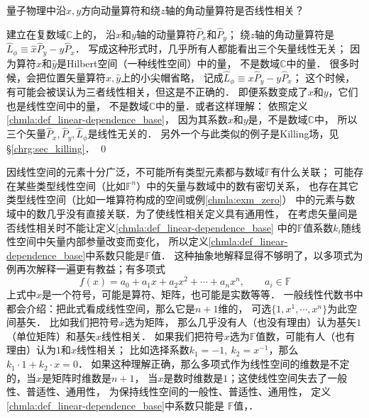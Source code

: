 \begin{example}
    量子物理中沿$x,y$方向动量算符和绕$z$轴的角动量算符是否线性相关？
\end{example}
建立在复数域$\mathbb{C}$上的，
沿$x$和$y$轴的动量算符$\hat{P}_x$和$\hat{P}_y$；
绕$z$轴的角动量算符是$\hat{L}_\phi \equiv \hat{x} \hat{P}_y-\hat{y}\hat{P}_x$．
写成这种形式时，几乎所有人都能看出三个矢量线性无关；
因为算符$\hat{x}$和$\hat{y}$是Hilbert空间（一种线性空间）中的量，
不是数域$\mathbb{C}$中的量．
很多时候，会把位置矢量算符$\hat{x},\hat{y}$上的小尖帽省略，
记成$\hat{L}_\phi \equiv {x} \hat{P}_y-{y}\hat{P}_x$；
这个时候，有可能会被误认为三者线性相关，但这是不正确的．
即便系数变成了$x$和$y$，它们也是线性空间中的量，
不是数域$\mathbb{C}$中的量．或者这样理解：
依照定义\ref{chmla:def_linear-dependence_base}，
因为其系数$x$和$y$是{}，不是数域$\mathbb{C}$中{}，
所以三个矢量$\hat{P}_x, \hat{P}_y, \hat{L}_\phi$是线性无关的．
另外一个与此类似的例子是Killing场，见\S \ref{chrg:sec_killing}．
\qed

因线性空间的元素十分广泛，不可能所有类型元素都与数域$\mathbb{F}$有什么关联；
可能存在某些类型线性空间（比如$\mathbb{F}^n$）中的矢量与数域中的数有密切关系，
也存在其它类型线性空间（比如一堆算符构成的空间或例\ref{chmla:exm_zero}）
中的元素与数域中的数几乎没有直接关联．为了使线性相关定义具有通用性，
在考虑矢量间是否线性相关时不能让定义\ref{chmla:def_linear-dependence_base}
中的$\mathbb{F}$值系数$k_i$随线性空间中矢量内部参量改变而变化，
所以定义\ref{chmla:def_linear-dependence_base}中系数只能是$\mathbb{F}$值．
这种抽象地解释显得不够明了，以多项式为例再次解释一遍更有教益；有多项式
\begin{equation}
    f(x)=a_0+a_1 x+ a_2 x^2 + \cdots+ a_n x^n, \qquad a_i \in \mathbb{F}
\end{equation}
上式中$x$是一个符号，可能是算符、矩阵，也可能是实数等等．
一般线性代数书中都会介绍：把此式看成线性空间，那么它是$n+1$维的，
可选$\{1,x^1,\cdots,x^n\}$为此空间基矢．
比如我们把符号$x$选为矩阵，
那么几乎没有人（也没有理由）认为基矢$1$（单位矩阵）和基矢$x$线性相关．
如果我们把符号$x$选为$\mathbb{F}$值数，可能有人（也有理由）认为$1$和$x$线性相关；
比如选择系数$k_1 =-1, \ k_2 = x^{-1}$，那么$k_1 \cdot 1 + k_2 \cdot x =0 $．
如果这种理解正确，那么多项式作为线性空间的维数是不定的，当$x$是矩阵时维数是$n+1$，
当$x$是数时维数是$1$；这使线性空间失去了一般性、普适性、通用性，
为保持线性空间的一般性、普适性、通用性，
定义\ref{chmla:def_linear-dependence_base}中系数只能是
$\mathbb{F}$值，．


